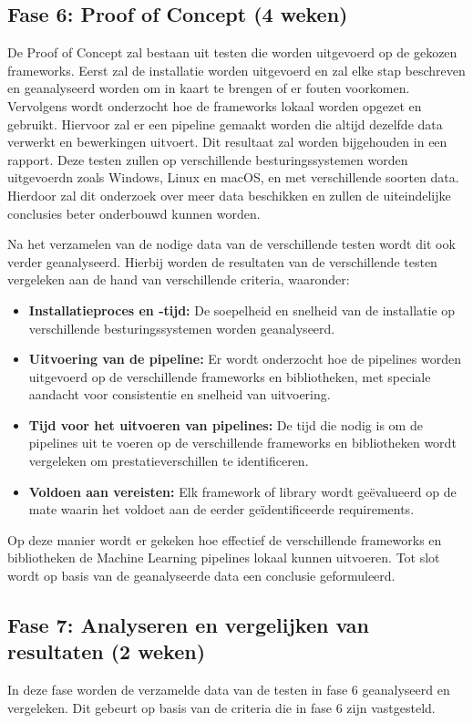\subsection{Fase 6: Proof of Concept (4 weken)}
De Proof of Concept zal bestaan uit testen die worden uitgevoerd op de gekozen frameworks. Eerst zal de installatie worden uitgevoerd en zal elke stap beschreven en geanalyseerd worden om in kaart te brengen of er fouten voorkomen. Vervolgens wordt onderzocht hoe de frameworks lokaal worden opgezet en gebruikt. Hiervoor zal er een pipeline gemaakt worden die altijd dezelfde data verwerkt en bewerkingen uitvoert. Dit resultaat zal worden bijgehouden in een rapport.
Deze testen zullen op verschillende besturingssystemen worden uitgevoerdn zoals Windows, Linux en macOS, en met verschillende soorten data. Hierdoor zal dit onderzoek over meer data beschikken en zullen de uiteindelijke conclusies beter onderbouwd kunnen worden.

Na het verzamelen van de nodige data van de verschillende testen wordt dit ook verder geanalyseerd. Hierbij worden de resultaten van de verschillende testen vergeleken aan de hand van verschillende criteria, waaronder:
\begin{itemize}
  \item \textbf{Installatieproces en -tijd:} De soepelheid en snelheid van de installatie op verschillende besturingssystemen worden geanalyseerd.
  \item \textbf{Uitvoering van de pipeline:} Er wordt onderzocht hoe de pipelines worden uitgevoerd op de verschillende frameworks en bibliotheken, met speciale aandacht voor consistentie en snelheid van uitvoering.
  \item \textbf{Tijd voor het uitvoeren van pipelines:} De tijd die nodig is om de pipelines uit te voeren op de verschillende frameworks en bibliotheken wordt vergeleken om prestatieverschillen te identificeren.
  \item \textbf{Voldoen aan vereisten:} Elk framework of library wordt geëvalueerd op de mate waarin het voldoet aan de eerder geïdentificeerde requirements.
\end{itemize}
Op deze manier wordt er gekeken hoe effectief de verschillende frameworks en bibliotheken de Machine Learning pipelines lokaal kunnen uitvoeren. Tot slot wordt op basis van de geanalyseerde data een conclusie geformuleerd.\\
\subsection{Fase 7: Analyseren en vergelijken van resultaten (2 weken)}
In deze fase worden de verzamelde data van de testen in fase 6 geanalyseerd en vergeleken. Dit gebeurt op basis van de criteria die in fase 6 zijn vastgesteld.

